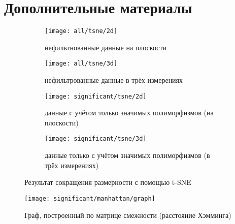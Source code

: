 \documentclass[main.tex]{subfiles}
\begin{document}
\newpage
\section{Дополнительные материалы}

\begin{figure}[H]
	\centering
	\begin{subfigure}{.5\textwidth}
		\centering
		\texttt{[image: all/tsne/2d]}
		\captionsetup{width=.8\linewidth}
		\caption{нефильтнованные данные на плоскости}
		\label{fig:all_tsne_2d}
	\end{subfigure}%
	\begin{subfigure}{.5\textwidth}
		\centering
		\texttt{[image: all/tsne/3d]}
		\captionsetup{width=.8\linewidth}
		\caption{нефильтрованные данные в трёх измерениях}
		\label{fig:all_tsne_3d}
	\end{subfigure}

	\begin{subfigure}{.5\textwidth}
		\centering
		\texttt{[image: significant/tsne/2d]}
		\captionsetup{width=.8\linewidth}
		\caption{данные с учётом только значимых полиморфизмов (на плоскости)}
		\label{fig:signif_tsne_2d}
	\end{subfigure}%
	\begin{subfigure}{.5\textwidth}
		\centering
		\texttt{[image: significant/tsne/3d]}
		\captionsetup{width=.8\linewidth}
		\caption{данные только с учётом значимых полиморфизмов (в трёх измерениях)}
		\label{fig:signif_tsne_3d}
	\end{subfigure}
	\caption{Результат сокращения размерности с помощью t-SNE}
\end{figure}

\begin{figure}[H]
	\centering \texttt{[image: significant/manhattan/graph]}
	\caption{Граф, построенный по матрице смежности (расстояние Хэмминга)}
	\label{fig:signif_manhattan_graph}
\end{figure}
\end{document}

